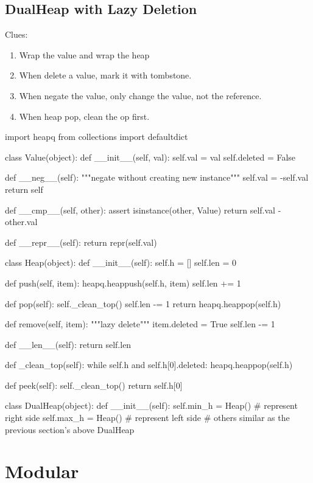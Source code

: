 \subsection{DualHeap with Lazy Deletion}\label{dh_lazy_del}
Clues:
\begin{enumerate}
\item Wrap the value and wrap the heap
\item When delete a value, mark it with tombstone. 
\item When negate the value, only change the value, not the reference. 
\item When heap pop, clean the op first. 
\end{enumerate}
\begin{python}
import heapq
from collections import defaultdict


class Value(object):
    def __init__(self, val):
        self.val = val
        self.deleted = False

    def __neg__(self):
        """negate without creating new instance"""
        self.val = -self.val
        return self

    def __cmp__(self, other):
        assert isinstance(other, Value)
        return self.val - other.val

    def __repr__(self):
        return repr(self.val)


class Heap(object):
    def __init__(self):
        self.h = []
        self.len = 0

    def push(self, item):
        heapq.heappush(self.h, item)
        self.len += 1

    def pop(self):
        self._clean_top()
        self.len -= 1
        return heapq.heappop(self.h)

    def remove(self, item):
        """lazy delete"""
        item.deleted = True
        self.len -= 1

    def __len__(self):
        return self.len

    def _clean_top(self):
        while self.h and self.h[0].deleted:
            heapq.heappop(self.h)

    def peek(self):
        self._clean_top()
        return self.h[0]


class DualHeap(object):
    def __init__(self):
        self.min_h = Heap()  # represent right side
        self.max_h = Heap()  # represent left side
    # others similar as the previous section's above DualHeap
\end{python}

\section{Modular}
